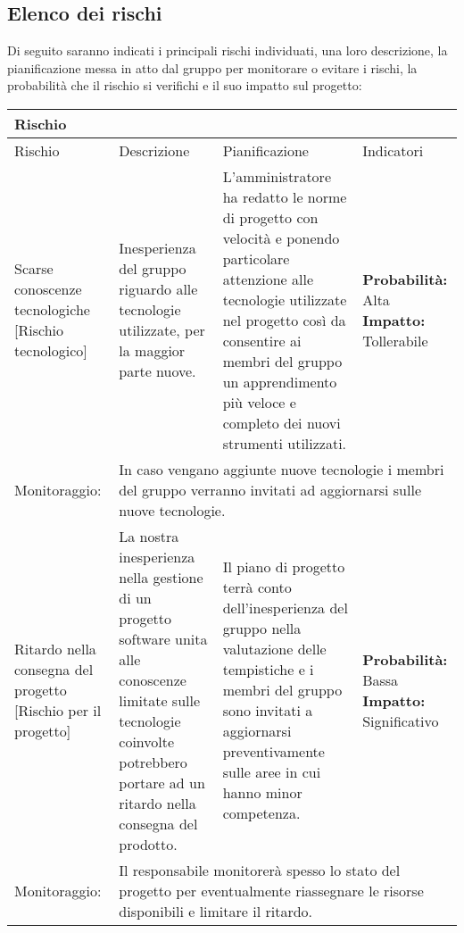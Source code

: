 \documentclass[../piano-di-progetto.tex]{subfiles}
\begin{document}
  \subsection{Elenco dei rischi}%
  \label{sub:elenco_dei_rischi}
  Di seguito saranno indicati i principali rischi individuati, una loro descrizione, la pianificazione messa in atto dal gruppo per monitorare o evitare i rischi, la probabilità che il rischio si verifichi e il suo impatto sul progetto:
      \renewcommand{\arraystretch}{2} %
      \begin{longtable}[H]{|p{10em}|p{13em}|p{13em}|p{10em}|}
      \rowcolor{darkgray!90!}
      \color{white}
      {\textbf{Rischio}} & \color{white}{\textbf{Descrizione}} & \color{white}{\textbf{Pianificazione}} & \color{white}{\textbf{Indicatori}} \\
      \endhead{}
      Rischio & Descrizione & Pianificazione & Indicatori\\
      \hline %
  \endhead{}
  Scarse conoscenze tecnologiche [Rischio tecnologico] & Inesperienza del gruppo riguardo alle tecnologie utilizzate, per la maggior parte nuove. & L'amministratore ha redatto le norme di progetto con velocità e ponendo particolare attenzione alle tecnologie utilizzate nel progetto così da consentire ai membri del gruppo un apprendimento più veloce e completo dei nuovi strumenti utilizzati. & \textbf{Probabilità:} Alta \textbf{Impatto:} Tollerabile \\
  Monitoraggio: & \multicolumn{3}{p{38.5em}|}{In caso vengano aggiunte nuove tecnologie i membri del gruppo verranno invitati ad aggiornarsi sulle nuove tecnologie.}\\
  \hline %
  Ritardo nella consegna del progetto [Rischio per il progetto] & La nostra inesperienza nella gestione di un progetto software unita alle conoscenze limitate sulle tecnologie coinvolte potrebbero portare ad un ritardo nella consegna del prodotto. & Il piano di progetto terrà conto dell'inesperienza del gruppo nella valutazione delle tempistiche e i membri del gruppo sono invitati a aggiornarsi preventivamente sulle aree in cui hanno minor competenza. & \textbf{Probabilità:}   Bassa \textbf{Impatto: }  Significativo  \\
  Monitoraggio: & \multicolumn{3}{p{38.5em}|}{Il responsabile monitorerà spesso lo stato del progetto per eventualmente riassegnare le risorse disponibili e limitare il ritardo.}\\

\end{longtable}
\end{document}
